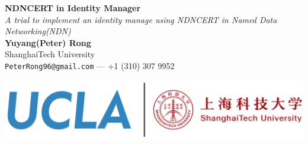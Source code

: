 \documentclass[a0,portrait]{poster}
\begin{document}


\begin{minipage}[b]{0.6\linewidth}
\veryHuge \color{NavyBlue} \textbf{NDNCERT in Identity Manager} \color{Black}\\ %
\Huge\textit{A trial to implement an identity manage using NDNCERT in Named Data Networking(NDN)}\\[2cm] %
\huge \textbf{Yuyang(Peter) Rong}\\[0.5cm] %
\huge ShanghaiTech University\\[0.4cm] %
\Large \texttt{PeterRong96@gmail.com} --- +1 (310) 307 9952\\
\end{minipage}
%
\begin{minipage}[b]{0.4\linewidth}
	\includegraphics[width=\linewidth]{figures/logo.png}\\
\end{minipage}

\vspace{0.7cm} %

\end{document}
